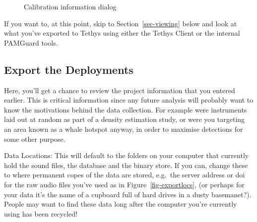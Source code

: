 \documentclass[
]{article}
\begin{document}
\begin{figure}
\begin{minipage}{0.50\linewidth}
{}


\end{minipage}%

\caption{\label{fig-cal}Calibration information dialog}

\end{figure}%

\begin{tcolorbox}[enhanced jigsaw, titlerule=0mm, rightrule=.15mm, opacitybacktitle=0.6, breakable, colframe=quarto-callout-tip-color-frame, coltitle=black, toptitle=1mm, bottomtitle=1mm, colback=white, title=\textcolor{quarto-callout-tip-color}{\faLightbulb}\hspace{0.5em}{See what you've exported so far}, arc=.35mm, bottomrule=.15mm, left=2mm, leftrule=.75mm, toprule=.15mm, colbacktitle=quarto-callout-tip-color!10!white, opacityback=0]

If you want to, at this point, skip to Section~\ref{sec-viewing} below
and look at what you've exported to Tethys using either the Tethys
Client or the internal PAMGuard tools.

\end{tcolorbox}

\subsection{Export the Deployments}\label{export-the-deployments}

Here, you'll get a chance to review the project information that you
entered earlier. This is critical information since any future analysis
will probably want to know the motivations behind the data collection.
For example were instruments laid out at random as part of a density
estimation study, or were you targeting an area known as a whale hotspot
anyway, in order to maximise detections for some other purpose.

Data Locations: This will default to the folders on your computer that
currently hold the sound files, the database and the binary store. If
you can, change these to where permanent copes of the data are stored,
e.g.~the server address or doi for the raw audio files you've used as in
Figure~\ref{fig-exportlocs}, (or perhaps for your data it's the name of
a cupboard full of hard drives in a dusty basemanet?). People may want
to find these data long after the computer you're currently using has
been recycled!
\end{document}
